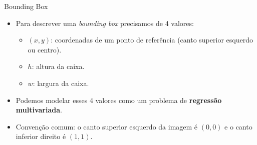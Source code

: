 \documentclass[aspectratio=169,xcolor=dvipsnames]{beamer}
\begin{document}
\begin{frame}{Bounding Box}
\begin{itemize}
    \item Para descrever uma \textit{bounding box} precisamos de 4 valores:
    \begin{itemize}
        \item $(x, y)$: coordenadas de um ponto de referência (canto superior esquerdo ou centro).
        \item $h$: altura da caixa.
        \item $w$: largura da caixa.
    \end{itemize}
    \item Podemos modelar esses 4 valores como um problema de \textbf{regressão multivariada}.
    \item Convenção comum: o canto superior esquerdo da imagem é $(0,0)$ e o canto inferior direito é $(1,1)$.
\end{itemize}
\end{frame}
\end{document}

